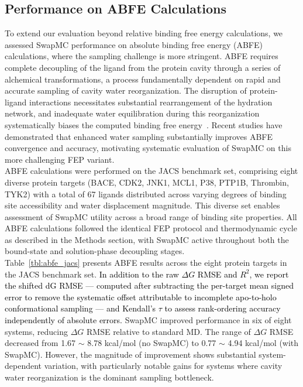 \documentclass[journal=jacsat,manuscript=article]{achemso}
\newcommand*{\textblue}[1]{\textcolor{black}{#1}}
\begin{document}
\subsection{Performance on ABFE Calculations}
To extend our evaluation beyond relative binding free energy calculations, we assessed SwapMC performance on absolute binding free energy (ABFE) calculations, where the sampling challenge is more stringent. 
ABFE requires complete decoupling of the ligand from the protein cavity through a series of alchemical transformations, 
a process fundamentally dependent on rapid and accurate sampling of cavity water reorganization. 
The disruption of protein-ligand interactions necessitates substantial rearrangement of the hydration network, 
and inadequate water equilibration during this reorganization systematically biases the computed binding free energy~\cite{Liu2025}. 
Recent studies have demonstrated that enhanced water sampling substantially improves ABFE convergence and accuracy, motivating systematic evaluation of SwapMC on this more challenging FEP variant. \\
\newline
ABFE calculations were performed on the JACS benchmark set, comprising eight diverse protein targets (BACE, CDK2, JNK1, MCL1, P38, PTP1B, Thrombin, TYK2) 
with a total of 67 ligands distributed across varying degrees of binding site accessibility and water displacement magnitude. 
This diverse set enables assessment of SwapMC utility across a broad range of binding site properties. 
All ABFE calculations followed the identical FEP protocol and thermodynamic cycle as described in the Methods section, with SwapMC active throughout both the bound-state and solution-phase decoupling stages. \\
\newline
Table~\ref{tbl:abfe_jacs} presents ABFE results across the eight protein targets in the JACS benchmark set. 
\textblue{
In addition to the raw $\Delta G$ RMSE and $R^2$, we report the shifted dG RMSE 
— computed after subtracting the per-target mean signed error to remove the systematic offset attributable to incomplete apo-to-holo conformational sampling 
— and Kendall's $\tau$ to assess rank-ordering accuracy independently of absolute errors. 
}
SwapMC improved performance in six of eight systems, reducing $\Delta G$ RMSE relative to standard MD.
The range of $\Delta G$ RMSE decreased from 1.67 $\sim$ 8.78 kcal/mol (no SwapMC) to 0.77 $\sim$ 4.94 kcal/mol (with SwapMC).
However, the magnitude of improvement shows substantial system-dependent variation, with particularly notable gains for systems where cavity water reorganization is the dominant sampling bottleneck. \\
\end{document}
